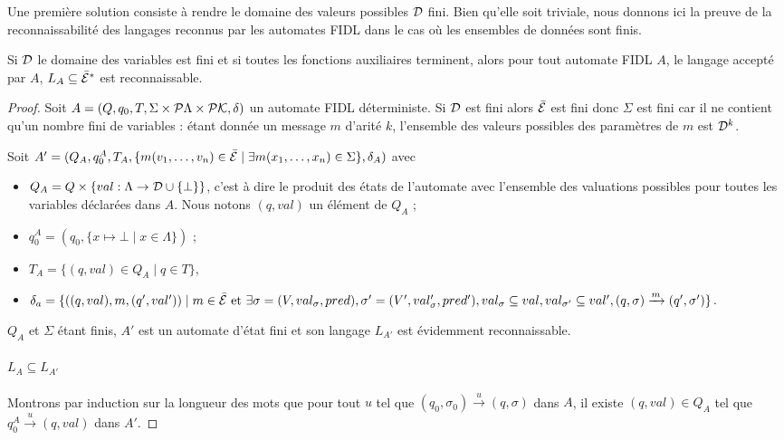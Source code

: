 Une premi\`ere solution consiste \`a rendre le domaine des valeurs
possibles $\cal D$ fini.  Bien qu'elle soit
triviale, nous donnons ici la preuve de la reconnaissabilit\'e des
langages reconnus par les automates \textsf{FIDL} dans le cas o\`u les
ensembles de donn\'ees sont finis.

\begin{prop}[Reconnaissabilit\'e]
    Si $\cal D$ le domaine des variables est fini et si toutes les
    fonctions auxiliaires terminent, alors pour tout automate \textsf{FIDL}
    $A$, le langage accept\'e par $A$, $L_A \subseteq \bar{\cal
    E}^*$ est reconnaissable.
\end{prop}

\begin{proof}
Soit $A=(Q,q_0,T,\Sigma \times{} {\cal P}\Lambda \times{} {\cal P}{\cal K}, \delta)$ un
automate \textsf{FIDL} d\'eterministe. Si  $\cal D$ est fini alors
$\bar{\cal E}$ est fini donc $\Sigma$ est fini car il ne  contient
qu'un nombre fini de variables :
\'etant donn\'ee un message $m$ d'arit\'e $k$, l'ensemble des
valeurs possibles des param\`etres de $m$ est ${\cal D}^k$.

Soit $A'=(Q_A,q_0^A,T_A, \{ m(v_1,\dots,v_n) \in \bar{\cal E} \mid
\exists m(x_1,\dots,x_n) \in \Sigma\},\delta_A)$ avec
\begin{itemize}
  \item $Q_A = Q \times{}\{val:\Lambda \rightarrow  {\cal D}\cup \{\bot\}\}$, c'est \`a dire le produit des \'etats de
  l'automate avec l'ensemble des valuations possibles pour
  toutes les variables d\'eclar\'ees dans $A$. Nous notons 
  $(q,val)$ un \'el\'ement de $Q_A$ ;
\item $q_0^A = (q_0, \{x\mapsto \bot \mid x\in \Lambda\})$ ;
\item $T_A = \{(q,val) \in Q_A\mid q \in T\}$,
\item $\delta_a = \{ ((q,val),m,(q',val'))\mid  m\in \bar{\cal E} \mbox{~et~} 
  \exists \sigma=(V,val_\sigma,pred),
  \sigma'=(V',val_\sigma',pred'),val_\sigma\subseteq val,
  val_{\sigma'}\subseteq val', (q,\sigma)\xrightarrow{m} (q',\sigma')\}$.
\end{itemize}
$Q_A$ et $\Sigma$ \'etant finis, $A'$  est un
automate d'\'etat fini et son langage  $L_{A'}$ est \'evidemment reconnaissable.

\paragraph{$L_A\subseteq L_{A'}$}
Montrons par induction sur la longueur des mots que pour tout $u$ tel
que $(q_0,\sigma_0) \xrightarrow{u} (q,\sigma)$ dans $A$, il existe
$(q,val)\in Q_A$ tel que $q_0^A
\xrightarrow{u}(q,val)$ dans $A'$.


\end{proof}
